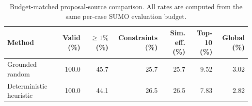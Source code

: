 \begin{table}[!ht]
    \caption{Budget-matched proposal-source comparison. All rates are computed from the same per-case SUMO evaluation budget.}
    \label{tab:proposal-source-comparison}
    \begin{center}
    \begin{tabular}{lrrrrrr}
        \hline
        Method & Valid (\%) & $\geq1\%$ (\%) & Constraints (\%) & Sim. eff. (\%) & Top-10 (\%) & Global (\%) \\
        \hline
        Grounded random & 100.0 & 45.7 & 25.7 & 25.7 & 9.52 & 3.02 \\
        Deterministic heuristic & 100.0 & 44.1 & 26.5 & 26.5 & 7.83 & 2.82 \\
        \hline
    \end{tabular}
    \end{center}
\end{table}
